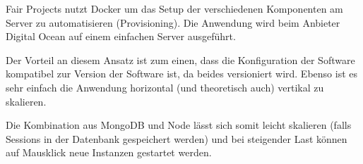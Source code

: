 Fair Projects nutzt Docker um das Setup der verschiedenen Komponenten am
Server zu automatisieren (Provisioning). Die Anwendung wird beim
Anbieter Digital Ocean auf einem einfachen Server ausgeführt.

Der Vorteil an diesem Ansatz ist zum einen, dass die Konfiguration der
Software kompatibel zur Version der Software ist, da beides versioniert
wird. Ebenso ist es sehr einfach die Anwendung horizontal (und
theoretisch auch) vertikal zu skalieren.

Die Kombination aus MongoDB und Node lässt sich somit leicht skalieren
(falls Sessions in der Datenbank gespeichert werden) und bei steigender
Last können auf Mausklick neue Instanzen gestartet werden.
